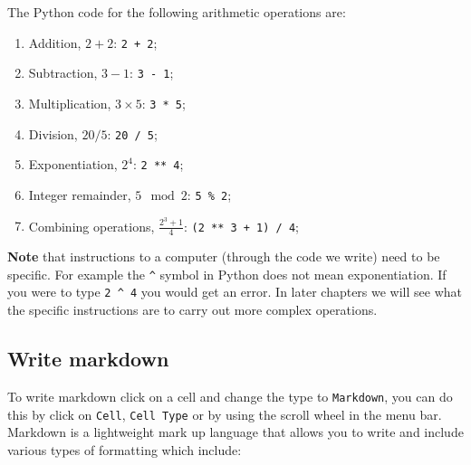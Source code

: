 The Python code for the following arithmetic operations are:

\begin{enumerate}

\item 

Addition, \(2 + 2\): \texttt{2 + 2};

\item 

Subtraction, \(3 - 1\): \texttt{3 - 1};

\item 

Multiplication, \(3 \times 5\): \texttt{3 * 5};

\item 

Division, \(20 / 5\): \texttt{20 / 5};

\item 

Exponentiation, \(2 ^ 4\): \texttt{2 ** 4};

\item 

Integer remainder, \(5 \mod 2\): \texttt{5 \% 2};

\item 

Combining operations, \(\frac{2 ^ 3 + 1}{4}\): \texttt{(2 ** 3 + 1) / 4};

\end{enumerate}


\textbf{Note} that instructions to a computer (through the code we write) need
to be specific. For example the \texttt{\textasciicircum{}} symbol in Python
does not mean exponentiation. If you were to type \texttt{2 \textasciicircum{} 4} you would get an error.
In later chapters we will see what the specific instructions are to carry out more complex operations.

\subsection{Write markdown}

To write markdown click on a cell and change the type to \texttt{Markdown}, you can do
this by click on \texttt{Cell}, \texttt{Cell Type} or by using the scroll wheel in the menu
bar.
Markdown is a lightweight mark up language that allows you to write and
include various types of formatting which include:

